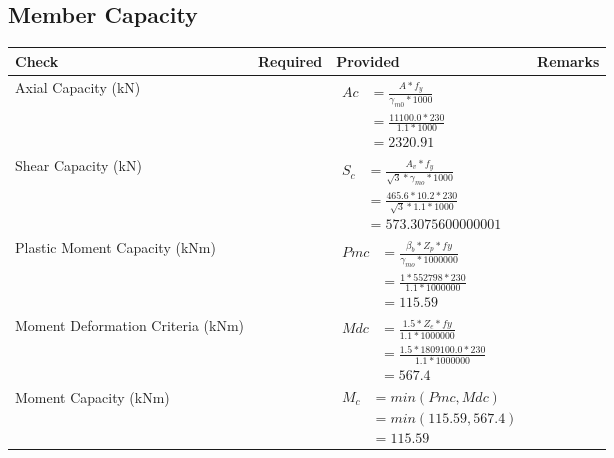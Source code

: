 \documentclass{article}%
\begin{document}
\subsection{Member Capacity}%
\label{subsec:MemberCapacity}%
\renewcommand{\arraystretch}{1.2}%
\begin{longtable}{|p{4cm}|p{5cm}|p{5.5cm}|p{1.5cm}|}%
\hline%
\rowcolor{OsdagGreen}%
Check&Required&Provided&Remarks\\%
\hline%
\endhead%
\hline%
Axial Capacity (kN)&&$\begin{aligned} Ac &=\frac{A*f_y}{\gamma_{m0} *1000}\\ &=\frac{11100.0*230}{1.1* 1000}\\ &=2320.91\end{aligned}$&\\%
\hline%
Shear Capacity (kN)&&$\begin{aligned} S_c &= \frac{A_v*f_y}{\sqrt{3}*\gamma_{mo} *1000}\\ &=\frac{465.6*10.2*230}{\sqrt{3}*1.1 *1000}\\ &=573.3075600000001\end{aligned}$&\\%
\hline%
Plastic Moment Capacity (kNm)&&$\begin{aligned} Pmc &= \frac{\beta_b * Z_p *fy}{\gamma_{mo} * 1000000}\\ &=\frac{1*552798*230}{1.1 * 1000000}\\ &=115.59\end{aligned}$&\\%
\hline%
Moment Deformation Criteria (kNm)&&$\begin{aligned} Mdc &= \frac{1.5 *Z_e *fy}{1.1 * 1000000}\\ &= \frac{1.5 *1809100.0*230}{1.1 * 1000000}\\ &= 567.4\end{aligned}$&\\%
\hline%
Moment Capacity (kNm)&&$\begin{aligned} M_c &= min(Pmc,Mdc)\\ &=min(115.59,567.4)\\ &=115.59\end{aligned}$&\\%
\hline%
\end{longtable}

%
\newpage%
\end{document}
